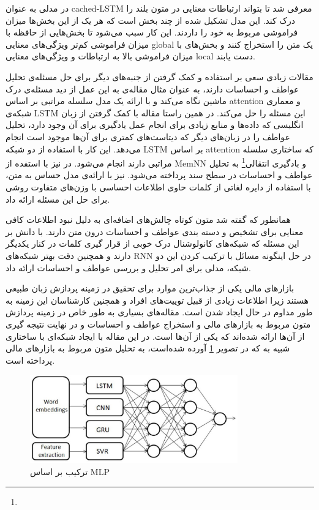 \documentclass[12pt, a4paper, oneside]{report}
\begin{document}
در
\cite{xu2016cached}
مدلی به عنوان
cached-LSTM
معرفی شد تا بتواند ارتباطات معنایی در متون بلند را درک کند. این مدل تشکیل شده از چند بخش است که هر یک از این
بخش‌ها میزان فراموشی مربوط به خود را داردند. این کار سبب می‌شود تا بخش‌هایی از حافظه با میزان فراموشی کم‌تر ویژگی‌های
معنایی
global
یک متن را استخراج کنند و بخش‌های با میزان فراموشی بالا به ارتباطات و ویژگی‌های معنایی
local
دست یابند.

مقالات زیادی سعی بر استفاده و کمک گرفتن از جنبه‌های دیگر برای حل مسئله‌ی تحلیل عواطف و احساسات دارند،
به عنوان مثال مقاله‌ی
\cite{yin-etal-2017-document}
به این عمل از دید مسئله‌ی درک ماشین نگاه می‌کند و با ارائه یک مدل سلسله مراتبی بر اساس
attention
و معماری شبکه‌ی
LSTM
این مسئله را حل می‌کند.
در همین راستا مقاله
\cite{zhou-etal-2016-attention}
با کمک گرفتن از زبان انگلیسی که داده‌ها و منابع زیادی برای انجام عمل یادگیری برای آن وجود دارد، تحلیل
عواطف را در زبان‌های دیگر که دیتاست‌های کمتری برای آن‌ها موجود است انجام می‌دهد. این کار با استفاده از دو شبکه
LSTM
بر اساس
attention
که ساختاری سلسله مراتبی دارند انجام می‌شود.
در
\cite{ijcai2017-311}
نیز با استفده از
MemNN
و
بادگیری انتقالی\footnote{}
به تحلیل عواطف و احساسات در سطح سند پرداخته می‌شود.
\cite{teng-etal-2016-context}
نیز با ارائه‌ی مدل
حساس به متن، با استفاده از دایره لغاتی از کلمات حاوی اطلاعات احساسی با وزن‌های متفاوت روشی برای حل این مسئله ارائه داد.

همانطور که گفته شد متون کوتاه چالش‌های اضافه‌ای به دلیل نبود اطلاعات کافی معنایی برای تشخیص و دسته بندی عواطف
و احساسات درون متن دارند.
\cite{wang-etal-2016-combination}
با دانش بر این مسئله که شبکه‌های کانولوشنال درک خوبی از قرار گیری کلمات در کنار یکدیگر دارند و همچنین دقت
بهتر شبکه‌های
RNN
در حل اینگونه مسائل با ترکیب کردن این دو شبکه، مدلی برای امر تحلیل و بررسی عواطف و احساسات ارائه داد.

بازارهای مالی یکی از جذاب‌ترین موارد برای تحقیق در زمینه پردازش زبان طبیعی هستند زیرا اطلاعات زیادی از قبیل
توییت‌های افراد و همچنین کارشناسان این زمینه به طور مداوم در حال ایجاد شدن است. مقاله‌های بسیاری به طور خاص در زمینه
پردازش متون مربوط به بازارهای مالی و استخراج عواطف و احساسات و در نهایت نتیجه گیری از آن‌ها ارائه شده‌اند که
\cite{akhtar2017multilayer}
یکی از آن‌ها است. در این مقاله با ایجاد شبکه‌ای با ساختاری شبیه به
که در تصویر
\ref{fig:MLP-ensemble}
آورده شده‌است، به تحلیل متون مربوط به بازار‌های مالی پرداخته است.

\begin{figure}[!ht]
    \centering
    \includegraphics[width=0.8\textwidth]{MLPENSEMBLE}
    \caption{ ترکیب بر اساس MLP }
    \label{fig:MLP-ensemble}
\end{figure}
\end{document}
